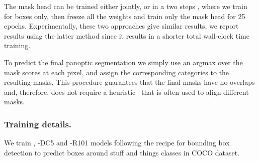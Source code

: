 The mask head can be trained either jointly, or in a two steps , where we
train \detr for boxes only, then freeze all the weights and train only the mask
head for 25 epochs. Experimentally, these two approaches give similar results,
we report results using the latter method since it results in a shorter total
wall-clock time training.


To predict the final panoptic segmentation we simply use an argmax over the mask scores at each pixel, and assign the corresponding categories to the resulting masks. This procedure guarantees that the final masks have no overlaps and, therefore, \detr does not require a heuristic~\cite{Kirillov2019panoptic} that is often used to align different masks.

\subsubsection{Training details.} We train \detr, \detr-DC5 and \detr-R101 models
following the recipe for bounding box detection to predict boxes around stuff
and things classes in COCO dataset.  

